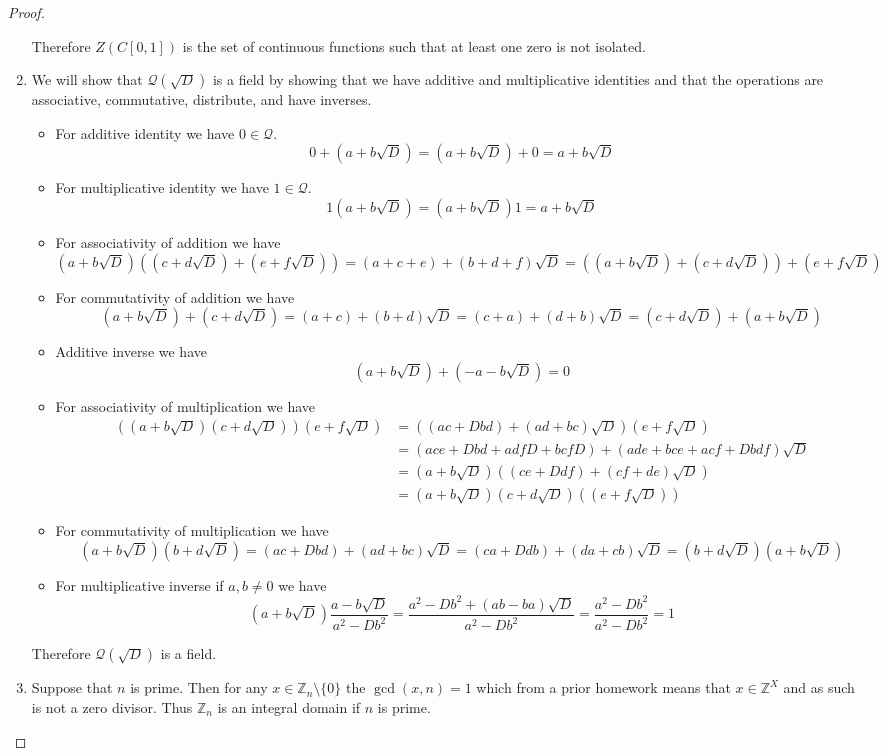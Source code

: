 \documentclass[10pt]{article}
\newcommand{\bb}[1]{\mathbb{#1}}
\theoremstyle{plain}
\theoremstyle{remark}
\begin{document}
\begin{proof}
\begin{enumerate}
    Therefore $Z(C[0,1])$ is the set of continuous functions such that
    at least one zero is not isolated.
  \item We will show that $\mathcal{Q}(\sqrt{D})$ is a field by showing that
    we have additive and multiplicative identities and that the operations are
    associative, commutative, distribute, and have inverses.
    \begin{itemize}
    \item For additive identity we have $0\in \mathcal{Q}$.
      \[0+(a+b\sqrt{D})=(a+b\sqrt{D})+0=a+b\sqrt{D}\]
    \item For multiplicative identity we have $1\in\mathcal{Q}$.
      \[ 1(a+b\sqrt{D})=(a+b\sqrt{D})1=a+b\sqrt{D} \]
    \item For associativity of addition we have
      \[ (a+b\sqrt{D})((c+d\sqrt{D})+(e+f\sqrt{D}))
        = (a+c+e)+(b+d+f)\sqrt{D}=((a+b\sqrt{D})+(c+d\sqrt{D}))+(e+f\sqrt{D})\]
    \item For commutativity of addition we have
      \[ (a+b\sqrt{D})+(c+d\sqrt{D})=(a+c)+(b+d)\sqrt{D}=(c+a)+(d+b)\sqrt{D}=
        (c+d\sqrt{D})+(a+b\sqrt{D})\]
    \item Additive inverse we have
      \[ (a+b\sqrt{D})+(-a-b\sqrt{D})=0\]
    \item For associativity of multiplication we have
      \begin{align*}
        ((a+b\sqrt{D})(c+d\sqrt{D}))(e+f\sqrt{D}) &= ((ac+Dbd)+(ad+bc)\sqrt{D})(e+f\sqrt{D})\\
                                                  &= (ace+Dbd+adfD+bcfD)+(ade+bce+acf+Dbdf)\sqrt{D}\\
                                                  &= (a+b\sqrt{D})((ce+Ddf)+(cf+de)\sqrt{D})\\
                                                  &= (a+b\sqrt{D})(c+d\sqrt{D})((e+f\sqrt{D}))
      \end{align*}
    \item For commutativity of multiplication we have
      \[ (a+b\sqrt{D})(b+d\sqrt{D})=(ac+Dbd)+(ad+bc)\sqrt{D}
        = (ca+Ddb)+(da+cb)\sqrt{D} = (b+d\sqrt{D})(a+b\sqrt{D})\]
    \item For multiplicative inverse if $a,b\neq 0$ we have
      \[ (a+b\sqrt{D})\frac{a-b\sqrt{D}}{a^2-Db^2}
        =\frac{a^2-Db^2+(ab-ba)\sqrt{D}}{a^2-Db^2}=\frac{a^2-Db^2}{a^2-Db^2}=1 \]
    \end{itemize}
    Therefore $\mathcal{Q}(\sqrt{D})$ is a field.
  \item Suppose that $n$ is prime. Then for any $x\in \bb{Z}_n\setminus\{0\}$ the $\gcd(x,n)=1$
    which from a prior homework means that $x\in\bb{Z}^X$ and as such is not a zero
    divisor. Thus $\bb{Z}_n$ is an integral domain if $n$ is prime.


\end{enumerate}
\end{proof}
\end{document}
